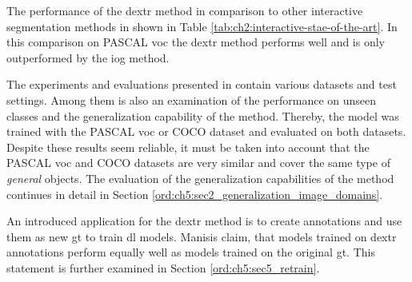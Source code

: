 The performance of the \gls{dextr} method in comparison to other interactive segmentation methods in shown in Table \ref{tab:ch2:interactive-stae-of-the-art}.
In this comparison on PASCAL \gls{voc} the \gls{dextr} method performs well and is only outperformed by the \gls{iog} method.

The experiments and evaluations presented in \cite{Man18-DEXTR} contain various datasets and test settings.
Among them is also an examination of the performance on unseen classes and the generalization capability of the method.
Thereby, the model was trained with the PASCAL \gls{voc} or COCO dataset and evaluated on both datasets.
Despite these results seem reliable, it must be taken into account that the PASCAL \gls{voc} and COCO datasets are very similar and cover the same type of \textit{general} objects.
The evaluation of the generalization capabilities of the method continues in detail in Section \ref{ord:ch5:sec2_generalization_image_domains}.

An introduced application for the \gls{dextr} method is to create annotations and use them as new \gls{gt} to train \gls{dl} models.
Manisis \etal claim, that models trained on \gls{dextr} annotations perform equally well as models trained on the original \gls{gt}\cite{Man18-DEXTR}.
This statement is further examined in Section \ref{ord:ch5:sec5_retrain}.